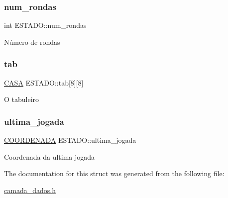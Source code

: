 \subsubsection{\texorpdfstring{num\+\_\+rondas}{num\_rondas}}
{\footnotesize\ttfamily int E\+S\+T\+A\+D\+O\+::num\+\_\+rondas}

Número de rondas \mbox{\label{struct_e_s_t_a_d_o_ab56f0f1be16954d3768b4174d14c087d}} 
\subsubsection{\texorpdfstring{tab}{tab}}
{\footnotesize\ttfamily \hyperlink{camada__dados_8h_aba91601f16d4c485b2d9b8c429f27039}{C\+A\+SA} E\+S\+T\+A\+D\+O\+::tab\mbox{[}8\mbox{]}\mbox{[}8\mbox{]}}

O tabuleiro \mbox{\label{struct_e_s_t_a_d_o_a4896a5c5c1f40b43fb795623327e3f47}} 
\subsubsection{\texorpdfstring{ultima\+\_\+jogada}{ultima\_jogada}}
{\footnotesize\ttfamily \hyperlink{struct_c_o_o_r_d_e_n_a_d_a}{C\+O\+O\+R\+D\+E\+N\+A\+DA} E\+S\+T\+A\+D\+O\+::ultima\+\_\+jogada}

Coordenada da ultima jogada 

The documentation for this struct was generated from the following file\+:\begin{DoxyCompactItemize}
\item 
\hyperlink{camada__dados_8h}{camada\+\_\+dados.\+h}\end{DoxyCompactItemize}

